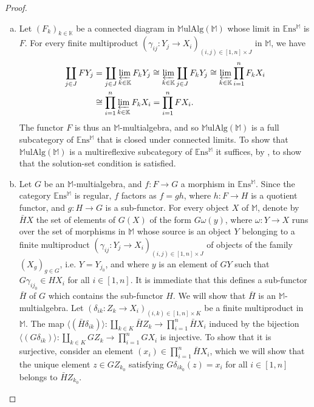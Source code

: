 \documentclass{article}
\newcommand{\bb}[1]{{\mathbb{#1}}}
\newcommand{\Set}{\mathbb{E}\mathrm{ns}}
\newcommand{\MulAlg}{\mathbb{M}\mathrm{ulAlg}}
\begin{document}
\begin{proof}
  \begin{enumerate}[a)]
    \item Let $(F_k)_{k\in\bb{K}}$ be a connected diagram in $\MulAlg(\bb{M})$ whose limit in $\Set^\bb{M}$ is $F$.
      For every finite multiproduct $(\gamma_{ij}\colon Y_j\to X_i)_{(i,j)\in[1,n]\times J}$ in $\bb{M}$, we have \cite[{}3.5.4.a]{2}
      \[
        \begin{aligned}
          \coprod_{j\in J} FY_j
          &= \coprod_{j\in J} \varprojlim_{k\in\bb{K}} F_kY_j
          \cong \varprojlim_{k\in\bb{K}} \coprod_{j\in J} F_kY_j
          \cong \varprojlim_{k\in\bb{K}} \prod_{i=1}^n F_kX_i
        \\&\cong \prod_{i=1}^n \varprojlim_{k\in\bb{K}} F_kX_i
          = \prod_{i=1}^n FX_i.
        \end{aligned}
      \]
      The functor $F$ is thus an $\bb{M}$-multialgebra, and so $\MulAlg(\bb{M})$ is a full subcategory of $\Set^\bb{M}$ that is closed under connected limits.
      To show that $\MulAlg(\bb{M})$ is a multireflexive subcategory of $\Set^\bb{M}$ it suffices, by \cite[Theorem~3.6.1]{2}, to show that the solution-set condition is satisfied.
    \item Let $G$ be an $\bb{M}$-multialgebra, and $f\colon F\to G$ a morphism in $\Set^\bb{M}$.
      Since the category $\Set^\bb{M}$ is regular, $f$ factors as $f=gh$, where $h\colon F\to H$ is a quotient functor, and $g\colon H\to G$ is a sub-functor.
      For every object $X$ of $\bb{M}$, denote by $\bar{H}X$ the set of elements of $G(X)$ of the form $G\omega(y)$, where $\omega\colon Y\to X$ runs over the set of morphisms in $\bb{M}$ whose source is an object $Y$ belonging to a finite multiproduct $(\gamma_{ij}\colon Y_j\to X_i)_{(i,j)\in[1,n]\times J}$ of objects of the family $(X_g)_{g\in G}$, i.e. $Y=Y_{j_0}$, and where $y$ is an element of $GY$ such that $G\gamma_{ij_0}\in HX_i$ for all $i\in[1,n]$.
      It is immediate that this defines a sub-functor $\bar{H}$ of $G$ which contains the sub-functor $H$.
      We will show that $\bar{H}$ is an $\bb{M}$-multialgebra.
      Let $(\delta_{ik}\colon Z_k\to X_i)_{(i,k)\in[1,n]\times K}$ be a finite multiproduct in $\bb{M}$.
      The map $\langle(\bar{H}\delta_{ik})\rangle\colon\coprod_{k\in K}\bar{H}Z_k\to\prod_{i=1}^n\bar{H}X_i$ induced by the bijection $\langle(G\delta_{ik})\rangle\colon\coprod_{k\in K}GZ_k\to\prod_{i=1}^nGX_i$ is injective.
      To show that it is surjective, consider an element $(x_i)\in\prod_{i=1}^n\bar{H}X_i$, which we will show that the unique element $z\in GZ_{k_0}$ satisfying $G\delta_{ik_0}(z)=x_i$ for all $i\in[1,n]$ belongs to $\bar{H}Z_{k_0}$.

\end{enumerate}
\end{proof}
\end{document}
